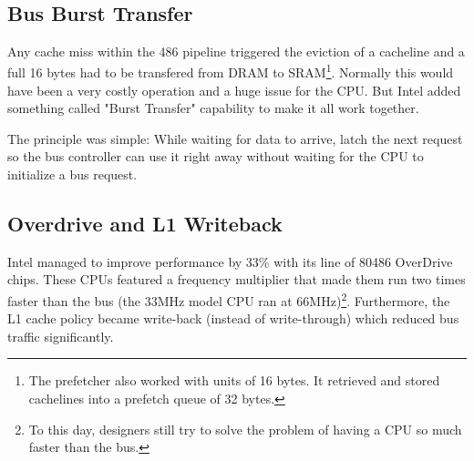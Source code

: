 \par
{}
\par
{}\\
\par




\subsection{Bus Burst Transfer}
Any cache miss within the 486 pipeline triggered the eviction of a cacheline and a full 16 bytes had to be transfered from DRAM to SRAM\footnote{The prefetcher also worked with units of 16 bytes. It retrieved and stored cachelines into a prefetch queue of 32 bytes.}. Normally this would have been a very costly operation and a huge issue for the CPU. But Intel added something called "Burst Transfer" capability to make it all work together.\\
\par
The principle was simple: While waiting for data to arrive, latch the next request so the bus controller can use it right away without waiting for the CPU to initialize a bus request.\\
\par
{}







\subsection{Overdrive and L1 Writeback}
Intel managed to improve performance by 33\% with its line of 80486 OverDrive chips. These CPUs featured a frequency multiplier that made them run two times faster than the bus (the 33MHz model CPU ran at 66MHz)\footnote{To this day, designers still try to solve the problem of having a CPU so much faster than the bus.}.  Furthermore, the L1 cache policy became write-back (instead of write-through) which reduced bus traffic significantly.\\
\par 
\vspace{10pt}
\par

